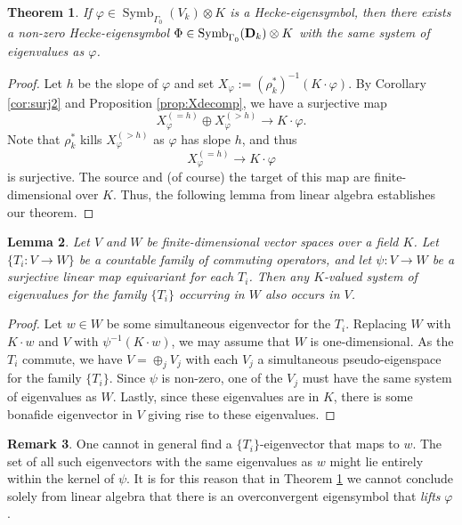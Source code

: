 \documentclass{amsart}
\theoremstyle{plain}
\newtheorem{thm}{Theorem}[section]
\newtheorem{lemma}[thm]{Lemma}
\theoremstyle{definition}
\newtheorem{remark}[thm]{Remark}
\newcommand{\bD}{{\bf D}}
\newcommand{\maps}{\rightarrow}
\renewcommand{\sp}{{\rho^*_k}}
\newcommand{\Dvrig}[1]{\bD_{#1}}
\newcommand{\Dkrig}{\Dvrig{k}}
\DeclareMathOperator{\Symb}{Symb}
\newcommand{\MSo}[1]{\Symb_{\Gamma_0}(#1)}
\begin{document}
\begin{thm}
\label{thm:eigenOMS} If $\varphi \in \MSo{V_k} \otimes K$ is a
Hecke-eigensymbol, then there exists a non-zero Hecke-eigensymbol
$\Phi \in \MSo{\Dkrig} \otimes K$ with the same system of
eigenvalues as $\varphi$.
\end{thm}


\begin{proof}
Let $h$ be the slope of $\varphi$ and set $X_\varphi :=
\left(\sp\right)^{-1}(K \cdot \varphi)$.  By Corollary
\ref{cor:surj2} and Proposition \ref{prop:Xdecomp}, we have a
surjective map
$$
X_\varphi^{(=h)} \oplus X_\varphi^{(>h)} \maps K \cdot \varphi.
$$
Note that $\sp$ kills $X_\varphi^{(>h)}$ as $\varphi$ has slope $h$, and thus
$$
X_\varphi^{(=h)} \maps K \cdot \varphi
$$
is surjective.  The source and (of course) the target of this map
are finite-dimensional over $K$.  Thus, the following lemma from linear
algebra establishes our theorem.
\end{proof}

\begin{lemma}
\label{lemma:linearalg} Let $V$ and $W$ be finite-dimensional vector spaces over a field $K$.  Let $\{T_i: V \maps W \}$ be a countable family of commuting operators, and let $\psi:V \maps W$ be a surjective linear map equivariant for each $T_i$.  Then any $K$-valued system of eigenvalues for the family $\{T_i\}$ occurring in $W$ also occurs in $V$.
\end{lemma}

\begin{proof}
Let $w \in W$ be some simultaneous eigenvector for the $T_i$.  Replacing $W$ with $K \cdot w$ and $V$ with $\psi^{-1}(K\cdot w)$, we may assume that $W$ is one-dimensional.  As the $T_i$ commute, we have $V = \oplus_j V_j$ with each $V_j$ a simultaneous pseudo-eigenspace for the family $\{T_i\}$.  Since $\psi$ is non-zero, one of the $V_j$ must have the same system of eigenvalues as $W$.  Lastly, since these eigenvalues are in $K$, there is some bonafide eigenvector in $V$ giving rise to these eigenvalues.
\end{proof}

\begin{remark}
\label{rmk:LA}
One cannot in general find a $\{T_i\}$-eigenvector that maps to $w$. The set of all such eigenvectors with the same eigenvalues as $w$ might lie entirely within the kernel of $\psi$. It is for this reason that in Theorem \ref{thm:eigenOMS} we cannot conclude solely from linear algebra that there is an overconvergent eigensymbol that {\it lifts} $\varphi$.
\end{remark}
\end{document}
